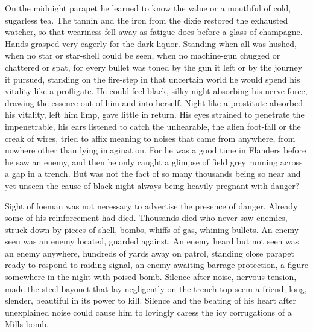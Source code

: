 On the midnight parapet he learned to know the value or a mouthful of cold, sugarless tea. The tannin and the iron from the dixie restored the exhausted watcher, so that weariness fell away as fatigue does before a glass of champagne. Hands grasped very eagerly for the dark liquor. Standing when all was hushed, when no star or star-shell could be seen, when no machine-gun chugged or chattered or spat, for every bullet was toned by the gun it left or by the journey it pursued, standing on the fire-step in that uncertain world he would spend his vitality like a profligate. He could feel black, silky night absorbing his nerve force, drawing the essence out of him and into herself. Night like a prostitute absorbed his vitality, left him limp, gave little in return. His eyes strained to penetrate the impenetrable, his ears listened to catch the unhearable, the alien foot-fall or the creak of wires, tried to affix meaning to noises that came from anywhere, from nowhere other than lying imagination. For he was a good time in Flanders before he saw an enemy, and then he only caught a glimpse of field grey running across a gap in a trench. But was not the fact of so many thousands being so near and yet unseen the cause of black night always being heavily pregnant with danger?

Sight of foeman was not necessary to advertise the presence of danger. Already some of his reinforcement had died. Thousands died who never saw enemies, struck down by pieces of shell, bombs, whiffs of gas, whining bullets. An enemy seen was an enemy located, guarded against. An enemy heard but not seen was an enemy anywhere, hundreds of yards away on patrol, standing close parapet ready to respond to raiding signal, an enemy awaiting barrage protection, a figure somewhere in the night with poised bomb. Silence after noise, nervous tension, made the steel bayonet that lay negligently on the trench top seem a friend; long, slender, beautiful in its power to kill. Silence and the beating of his heart after unexplained noise could cause him to lovingly caress the icy corrugations of a Mills bomb.

